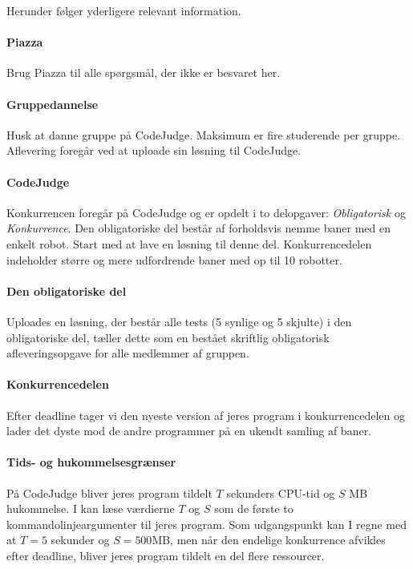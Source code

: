 \documentclass[10pt, a4paper]{article}
\begin{document}
Herunder følger yderligere relevant information.

\paragraph{Piazza} Brug Piazza til alle spørgsmål, der ikke er besvaret her.

\paragraph{Gruppedannelse} Husk at danne gruppe på CodeJudge.
Maksimum er fire studerende per gruppe.
Aflevering foregår ved at uploade sin løsning til CodeJudge.

\paragraph{CodeJudge} Konkurrencen foregår på CodeJudge og er opdelt i to delopgaver: \emph{Obligatorisk} og \emph{Konkurrence}.
Den obligatoriske del består af forholdsvis nemme baner med en enkelt robot.
Start med at lave en løsning til denne del.
Konkurrencedelen indeholder større og mere udfordrende baner med op til 10 robotter.

\paragraph{Den obligatoriske del} Uploades en løsning, der består alle tests (5 synlige og 5 skjulte) i den obligatoriske del, tæller dette som en bestået skriftlig obligatorisk afleveringsopgave for alle medlemmer af gruppen.

\paragraph{Konkurrencedelen} Efter deadline tager vi den nyeste version af jeres program i konkurrencedelen og lader det dyste mod de andre programmer på en ukendt samling af baner.

\paragraph{Tids- og hukommelsesgrænser} På CodeJudge bliver jeres program tildelt $T$ sekunders CPU-tid og $S$ MB hukommelse. I kan læse værdierne $T$ og $S$ som de første to kommandolinjeargumenter til jeres program. Som udgangspunkt kan I regne med at $T=5$ sekunder og $S=500$MB, men når den endelige konkurrence afvikles efter deadline, bliver jeres program tildelt en del flere ressourcer.
\end{document}
